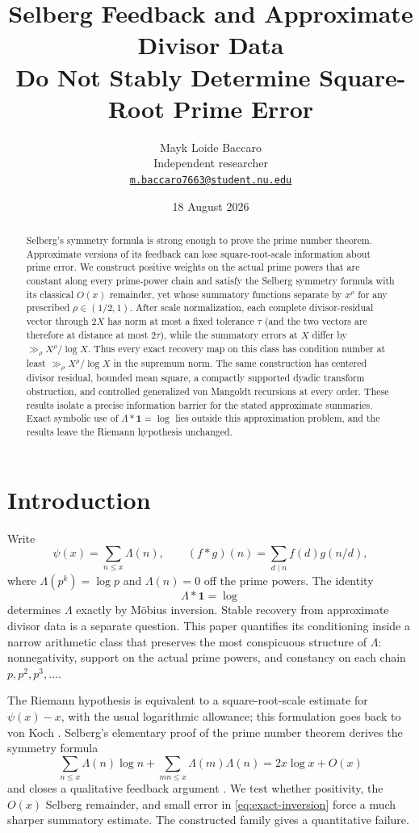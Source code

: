 \documentclass[11pt,a4paper]{amsart}
\title[Selberg feedback and prime error]{Selberg Feedback and Approximate Divisor Data\\Do Not Stably Determine Square-Root Prime Error}
\author[Mayk Loide Baccaro]{Mayk Loide Baccaro\\
Independent researcher\\
\href{mailto:m.baccaro7663@student.nu.edu}{\texttt{m.baccaro7663@student.nu.edu}}}
\date{18 August 2026}
\theoremstyle{definition}
\newcommand{\1}{\mathbf 1}
\begin{document}
\begin{abstract}
Selberg's symmetry formula is strong enough to prove the prime number theorem.
Approximate versions of its feedback can lose square-root-scale information
about prime error.  We construct positive weights on the actual
prime powers that are constant along every prime-power chain and satisfy the
Selberg symmetry formula with its classical $O(x)$ remainder, yet whose
summatory functions separate by $x^\rho$ for any prescribed
$\rho\in(1/2,1)$.  After scale normalization, each complete divisor-residual
vector through $2X$ has norm at most a fixed tolerance $\tau$ (and the two
vectors are therefore at distance at most $2\tau$), while the summatory errors
at $X$ differ by $\gg_\rho X^\rho/\log X$.  Thus every exact recovery map on
this class has condition number at least $\gg_\rho X^\rho/\log X$ in the
supremum norm.  The same construction has centered divisor residual, bounded
mean square, a compactly supported dyadic transform obstruction, and
controlled generalized von Mangoldt recursions at every order.  These results
isolate a precise information barrier for the stated approximate summaries.
Exact symbolic use of $\Lambda*\1=\log$ lies outside this approximation
problem, and the results leave the Riemann hypothesis unchanged.
\end{abstract}

\maketitle

\section{Introduction}

Write
\[
  \psi(x)=\sum_{n\le x}\Lambda(n),
  \qquad (f*g)(n)=\sum_{d\mid n}f(d)g(n/d),
\]
where $\Lambda(p^k)=\log p$ and $\Lambda(n)=0$ off the prime powers.  The identity
\begin{equation}\label{eq:exact-inversion}
  \Lambda*\1=\log
\end{equation}
determines $\Lambda$ exactly by M\"obius inversion.  Stable recovery from
approximate divisor data is a separate question.  This paper quantifies its
conditioning inside a narrow arithmetic class that preserves the most
conspicuous structure of $\Lambda$: nonnegativity, support on the actual prime
powers, and constancy on each chain $p,p^2,p^3,\ldots$.

The Riemann hypothesis is equivalent to a square-root-scale estimate for $\psi(x)-x$, with the usual logarithmic allowance; this formulation goes back to von Koch \cite{vonKoch1901}.  Selberg's elementary proof of the prime number theorem derives the symmetry formula
\begin{equation}\label{eq:selberg-classical}
 \sum_{n\le x}\Lambda(n)\log n
 +\sum_{mn\le x}\Lambda(m)\Lambda(n)
 =2x\log x+O(x)
\end{equation}
and closes a qualitative feedback argument \cite{Selberg1949}.  We test
whether positivity, the $O(x)$ Selberg remainder, and small error in
\eqref{eq:exact-inversion} force a much sharper summatory estimate.  The
constructed family gives a quantitative failure.
\end{document}
